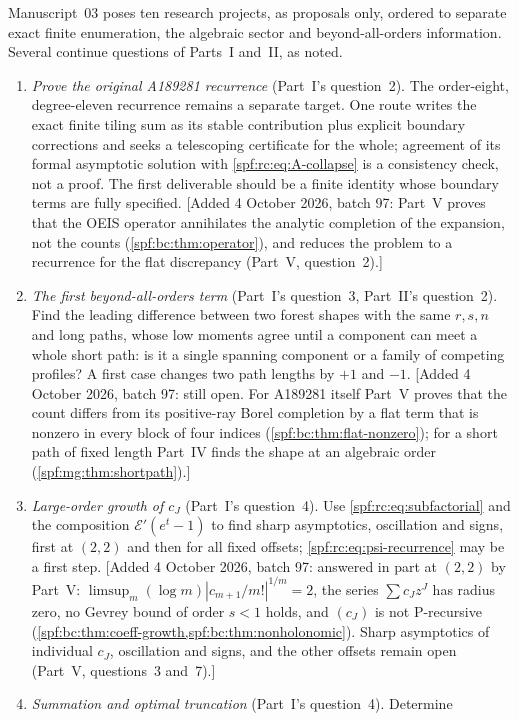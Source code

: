 \documentclass[11pt]{article}
\numberwithin{equation}{section}
\theoremstyle{definition}
\theoremstyle{remark}
\theoremstyle{definition}
\begin{document}
Manuscript~03 poses ten research projects, as proposals only, ordered to
separate exact finite enumeration, the algebraic sector and
beyond-all-orders information. Several continue questions of Parts~I
and~II, as noted.
\begin{enumerate}
\item \emph{Prove the original A189281 recurrence} (Part~I's question~2).
The order-eight, degree-eleven recurrence remains a separate target. One
route writes the exact finite tiling sum as its stable contribution plus
explicit boundary corrections and seeks a telescoping certificate for the
whole; agreement of its formal asymptotic solution with
\eqref{spf:rc:eq:A-collapse} is a consistency check, not a proof. The first
deliverable should be a finite identity whose boundary terms are fully
specified.
[Added 4 October 2026, batch 97: Part~V proves that the OEIS operator
annihilates the analytic completion of the expansion, not the counts
(\cref{spf:bc:thm:operator}), and reduces the problem to a recurrence for the
flat discrepancy (Part~V, question~2).]
\item \emph{The first beyond-all-orders term} (Part~I's question~3, Part~II's
question~2). Find the leading difference between two forest shapes with the
same $r,s,n$ and long paths, whose low moments agree until a component can
meet a whole short path: is it a single spanning component or a family of
competing profiles? A first case changes two path lengths by $+1$ and $-1$.
[Added 4 October 2026, batch 97: still open. For A189281 itself Part~V proves
that the count differs from its positive-ray Borel completion by a flat term
that is nonzero in every block of four indices
(\cref{spf:bc:thm:flat-nonzero}); for a short path of fixed length Part~IV
finds the shape at an algebraic order (\cref{spf:mg:thm:shortpath}).]
\item \emph{Large-order growth of $c_J$} (Part~I's question~4). Use
\eqref{spf:rc:eq:subfactorial} and the composition $\mathcal E'(e^t-1)$ to
find sharp asymptotics, oscillation and signs, first at $(2,2)$ and then for
all fixed offsets; \eqref{spf:rc:eq:psi-recurrence} may be a first step.
[Added 4 October 2026, batch 97: answered in part at $(2,2)$ by Part~V:
$\limsup_m(\log m)|c_{m+1}/m!|^{1/m}=2$, the series $\sum c_Jz^J$ has radius
zero, no Gevrey bound of order $s<1$ holds, and $(c_J)$ is not P-recursive
(\cref{spf:bc:thm:coeff-growth,spf:bc:thm:nonholonomic}). Sharp asymptotics
of individual $c_J$, oscillation and signs, and the other offsets remain open
(Part~V, questions~3 and~7).]
\item \emph{Summation and optimal truncation} (Part~I's question~4). Determine

\end{enumerate}
\end{document}
